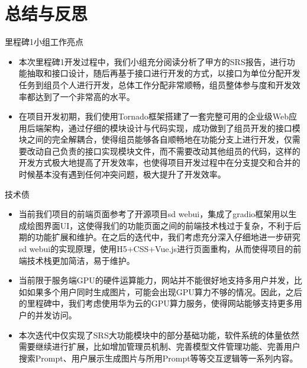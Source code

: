 %
%
%
%
\section{总结与反思}
\begin{frame}{里程碑1小组工作亮点}
    \begin{itemize}
        \item 本次里程碑1开发过程中，我们小组充分阅读分析了甲方的SRS报告，进行功能抽取和接口设计，随后再基于接口进行开发的方式，以接口为单位分配开发任务到组员个人进行开发，总体工作分配非常顺畅，组员整体参与度和开发效率都达到了一个非常高的水平。
        \item 在项目开发初期，我们使用Tornado框架搭建了一套完整可用的企业级Web应用后端架构，通过仔细的模块设计与代码实现，成功做到了组员开发的接口模块之间的完全解耦合，使得组员能够各自顺畅地在功能分支上进行开发，仅需要改动自己负责的接口实现模块文件，而不需要改动其他组员的代码，这样的开发方式极大地提高了开发效率，也使得项目开发过程中在分支提交和合并的时候基本没有遇到任何冲突问题，极大提升了开发效率。
    \end{itemize}
\end{frame}

\begin{frame}{技术债}
    \begin{itemize}
        \item 当前我们项目的前端页面参考了开源项目sd webui，集成了gradio框架用以生成绘图界面UI，这使得我们的功能页面之间的前端技术栈过于复杂，不利于后期的功能扩展和维护。在之后的迭代中，我们考虑充分深入仔细地进一步研究sd webui的实现原理，使用H5+CSS+Vue.js进行页面重构，从而使得项目的前端技术栈更加简洁，易于维护。
        \item 当前限于服务端GPU的硬件运算能力，网站并不能很好地支持多用户并发，比如如果多个用户同时生成图片，可能会出现GPU算力不够的情况。因此，之后的里程碑中，我们考虑使用华为云的GPU算力服务，使得网站能够支持更多用户的并发访问。
        \item 本次迭代中仅实现了SRS大功能模块中的部分基础功能，软件系统的体量依然需要继续进行扩展，比如增加管理员机制、完善模型文件管理功能、完善用户搜索Prompt、用户展示生成图片与所用Prompt等等交互逻辑等一系列内容。
    \end{itemize}
\end{frame}

